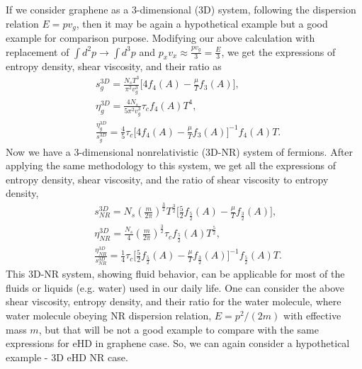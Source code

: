 \documentclass[%
 reprint,
 amsmath,amssymb,
 aps,
]{revtex4-2}
\begin{document}
    If we consider graphene as a 3-dimensional (3D) system, following the dispersion relation $E=pv_g$, then it may be again a hypothetical example but a good example for comparison purpose. Modifying our above calculation with replacement of $\int d^2p\rightarrow \int d^3p$ and $p_xv_x\approx \frac{pv_g}{3}=\frac{E}{3}$, we get the expressions of entropy density, shear viscosity, and their ratio as
    \begin{align}
    & s_g^{3D} = \frac{N_s T^3}{\pi^2 v_g^3} \Bigg[4f_4\left(A\right) - \frac{\mu}{T} f_3\left(A\right) \Bigg],
    \label{sg_3D}
    \\
    & \eta_{g}^{3D} = \frac{4 N_s }{5 \pi^2 v_g^3} \tau_c f_4\left(A\right) T^4,
    \label{eg_3D}
    \\
    & \frac{\eta_g^{3D}}{ s_g^{3D}} = \frac{4}{5} \tau_c \Bigg[4f_4\left(A\right) - \frac{\mu}{T} f_3\left(A\right) \Bigg]^{-1}  f_4\left(A\right) T.
    \label{esg_3D}
    \end{align}
%
    Now we have a 3-dimensional nonrelativistic (3D-NR) system of fermions. After applying the same methodology to this system, we get all the expressions of entropy density, shear viscosity, and the ratio of shear viscosity to entropy density,
%
    \begin{align}
    & s_{NR}^{3D} = N_s \left( \frac{m}{2 \pi }\right)^{\frac{3}{2}} T^{\frac{3}{2}} \Bigg[\frac{5}{2} f_{\frac{5}{2}}\left(A\right) - \frac{\mu}{T} f_{\frac{3}{2}}\left(A\right) \Bigg],
    \label{sNR_3D}
    \\
    & \eta_{NR}^{3D} = \frac{N_s}{4} \left( \frac{m}{2 \pi }\right)^{\frac{3}{2}} \tau_c f_{\frac{5}{2}}\left(A\right) T^{\frac{5}{2}},
    \label{eNR_3D}
    \\
     & \frac{\eta_{NR}^{3D}}{ s_{NR}^{3D}} = \frac{1}{4} \tau_c \Bigg[\frac{5}{2} f_{\frac{5}{2}}\left(A\right) - \frac{\mu}{T} f_{\frac{3}{2}}\left(A\right) \Bigg]^{-1} f_{\frac{5}{2}}\left(A\right) T.
     \label{esNR_3D}
    \end{align}
    This 3D-NR system, showing fluid behavior, can be applicable for most of the fluids or liquids (e.g. water) used in our daily life.  
    One can consider the above shear viscosity, entropy density, and their ratio for the water molecule, where water molecule obeying NR dispersion relation, $E=p^2/(2m)$ with effective mass $m$, but that will be not a good example to compare with the same expressions for eHD in graphene case. So, we can again consider a hypothetical example - 3D eHD NR case.
\end{document}
